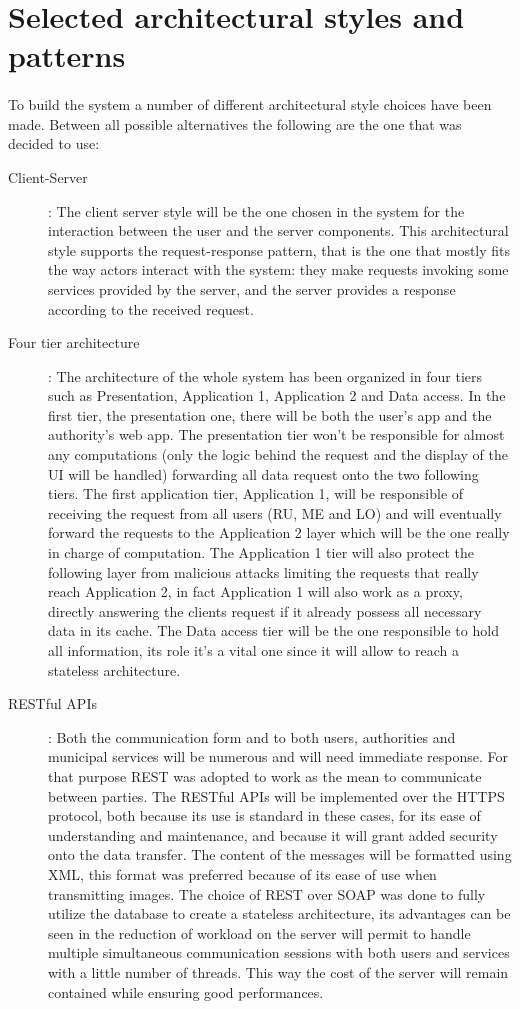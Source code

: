 		\section{Selected architectural styles and patterns}
			\paragraph{}
				To build the system a number of different architectural style choices have been made. Between all possible alternatives the following are the one that was decided to use:
					\begin{description}
						\item [Client-Server] : The client server style will be the one chosen in the system for the interaction between the user and the server components. This architectural style supports the request-response pattern, that is the one that mostly fits the way actors interact with the system: they make requests invoking some services provided by the server, and the server provides a response according to the received request.
						\item [Four tier architecture]: The architecture of the whole system has been organized in four tiers such as Presentation, Application 1, Application 2 and Data access. In the first tier, the presentation one, there will be both the user's app and the authority's web app. The presentation tier won't be responsible for almost any computations (only the logic behind the request and the display of the UI will be handled) forwarding all data request onto the two following tiers. The first application tier, Application 1, will be responsible of receiving the request from all users (RU, ME and LO) and will eventually forward the requests to the Application 2 layer which will be the one really in charge of computation. The Application 1 tier will also protect the following layer from malicious attacks limiting the requests that really reach Application 2, in fact Application 1 will also work as a proxy, directly answering the clients request if it already possess all necessary data in its cache. The Data access tier will be the one responsible to hold all information, its role it's a vital one since it will allow to reach a stateless architecture.  
						\item [RESTful APIs]: Both the communication form and to both users, authorities and municipal services will be numerous and will need immediate response. For that purpose REST was adopted to work as the mean to communicate between parties.  The RESTful APIs will be implemented over the HTTPS protocol, both because its use is standard in these cases, for its ease of understanding and maintenance, and because it will grant added security onto the data transfer. The content of the messages will be formatted using XML, this format was preferred because of its ease of use when transmitting images. The choice of REST over SOAP was done to fully utilize the database to create a stateless architecture, its advantages can be seen in the reduction of workload on the server will permit to handle multiple simultaneous communication sessions with both users and services with a little number of threads. This way the cost of the server will remain contained while ensuring good performances.

\end{description}
